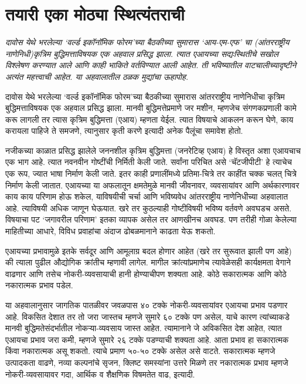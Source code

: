 \chapter{तयारी एका मोठ्या स्थित्यंतराची }

{\textit{दावोस येथे भरलेल्या `वर्ल्ड इकॉनॉमिक फोरम'च्या बैठकीच्या सुमारास `आय-एम-एफ' चा (आंतरराष्ट्रीय नाणेनिधी)कृत्रिम बुद्धिमत्ताविषयक एक अहवाल प्रसिद्ध झाला. त्यात एआयच्या सद्यःस्थितीचे सखोल विश्लेषण करण्यात आले आणि काही भाकिते वर्तविण्यात आली आहेत. ती भविष्यातील वाटचालीच्यादृष्टीने अत्यंत महत्त्वाची आहेत. या अहवालातील ठळक मुद्यांचा ऊहापोह.}}

\vspace{1.5em}

दावोस येथे भरलेल्या `वर्ल्ड इकॉनॉमिक फोरम'च्या बैठकीच्या सुमारास आंतरराष्ट्रीय नाणेनिधीचा कृत्रिम बुद्धिमत्ताविषयक एक अहवाल प्रसिद्ध झाला. मानवी बुद्धिमत्तेप्रमाणे जर मशीन, म्हणजेच संगणकप्रणाली कामे करू लागली तर त्यास कृत्रिम बुद्धिमत्ता (एआय) म्हणता येईल. त्यात विषयाचे आकलन करून घेणे, काय करायला पाहिजे ते समजणे, त्यानुसार कृती करणे इत्यादी अनेक पैलूंचा समावेश होतो.

नजीकच्या काळात प्रसिद्ध झालेले जननशील कृत्रिम बुद्धिमत्ता (जनरेटिव्ह एआय) हे विस्तृत अशा एआयचाच एक भाग आहे. त्यात नवनवीन गोष्टींची निर्मिती केली जाते. सर्वांना परिचित असे `चॅटजीपीटी' हे त्याचेच एक रूप, ज्यात भाषा निर्माण केली जाते. इतर काही प्रणालींमध्ये प्रतिमा-चित्रे तर काहींत चक्क चलत् चित्रे निर्माण केली जातात. एआयच्या या अफलातून क्षमतेमुळे मानवी जीवनावर, व्यवसायांवर आणि अर्थकारणावर काय काय परिणाम होऊ शकेल, याविषयीची चर्चा आणि भविष्यवेध आंतरराष्ट्रीय नाणेनिधीच्या अहवालात आहे. त्याविषयी अधिक जाणून घेऊयात. खरे तर कुठल्याही गोष्टीविषयी भविष्य वर्तवणे अवघडच असते. विषयाचा पट `जगावरील परिणाम' इतका व्यापक असेल तर आणखीनच अवघड. पण तरीही गोळा केलेल्या माहितीच्या आधारे, विविध प्रवाहांचा अंदाज ढोबळमानाने काढता येऊ शकतो.

एआयच्या प्रभावामुळे इतके सर्वदूर आणि आमूलाग्र बदल होणार आहेत (खरे तर सुरूवात झाली पण आहे) की त्याला पुढील औद्योगिक क्रांतीच म्हणावी लागेल. मागील क्रांत्यांप्रमाणेच त्यावेळेसही कार्यक्षमता वेगाने वाढणार आणि तसेच नोकरी-व्यवसायाची हानी होण्याचीपण शक्यता आहे. कोठे सकारात्मक आणि कोठे नकारात्मक प्रभाव पडेल.

या अहवालानुसार जागतिक पातळीवर जवळपास ४० टक्के नोकरी-व्यवसायांवर एआयचा प्रभाव पडणार आहे. विकसित देशात तर तो जरा जास्तच म्हणजे सुमारे ६० टक्के पण असेल, याचे कारण त्यांच्याकडे मानवी बुद्धिमतेसंदर्भातील नोकऱ्या-व्यवसाय जास्त आहेत. त्यामानाने जे अविकसित देश आहेत, त्यात एआयचा प्रभाव जरा कमी, म्हणजे सुमारे २६ टक्के पडण्याची शक्यता आहे. आता प्रभाव हा सकारात्मक किंवा नकारात्मक असू शकतो. त्याचे प्रमाण ५०-५० टक्के असेल असे वाटते. सकारात्मक म्हणजे उत्पादकता वाढणे, नव्या कल्पनांचे सृजन, क्लिष्ट समस्यांना उत्तरे मिळणे तर नकारात्मक प्रभाव म्हणजे नोकरी-व्यवसायावर गदा, आर्थिक व शैक्षणिक  विषमतेत वाढ, इत्यादी.

